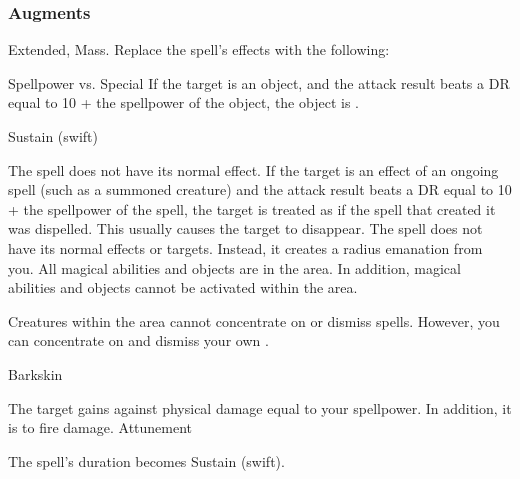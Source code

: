 \subsubsection{Augments}
 Extended, Mass.
Replace
the spell's effects with the following:
\begin{augmenteffects}
\begin{spellattack}{Spellpower vs. Special}
\spellspecial
If the target is an object, and the attack result beats a DR equal to 10 + the spellpower of the object, the object is .
\end{spellattack}
\spelldur Sustain (swift)
\end{augmenteffects}
The spell does not have its normal effect.
If the target is an effect of an ongoing spell (such as a summoned creature) and the attack result beats a DR equal to 10 + the spellpower of the spell, the target is treated as if the spell that created it was dispelled.
This usually causes the target to disappear.
The spell does not have its normal effects or targets.
Instead, it creates a \areasmall radius emanation from you.
All magical abilities and objects are  in the area.
In addition, magical abilities and objects cannot be activated within the area.
\par Creatures within the area cannot concentrate on or dismiss spells. However, you can concentrate on and dismiss your own .
\begin{spellsection}{Barkskin}
\begin{spellheader}
\end{spellheader}
\begin{spellcontent}
\begin{spelltargetinginfo}
\end{spelltargetinginfo}
\begin{spelleffects}
\spelleffect
The target gains  against physical damage equal to your spellpower.
In addition, it is  to fire damage.
\spelldur Attunement
\end{spelleffects}
\end{spellcontent}
\begin{spellfooter}
\miscastexplode
\end{spellfooter}
\begin{spellcantrip}
The spell's duration becomes Sustain (swift).
\end{spellcantrip}
\end{spellsection}
